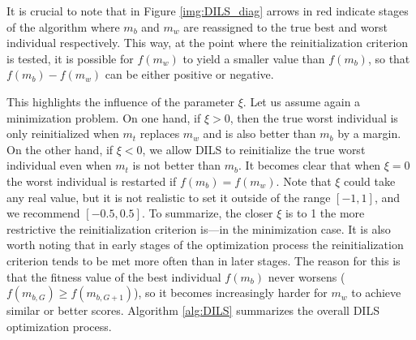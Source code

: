 It is crucial to note that in Figure \ref{img:DILS_diag} arrows in red indicate stages of the algorithm where $m_b$ and $m_w$ are reassigned to the true best and worst individual respectively. This way, at the point where the reinitialization criterion is tested, it is possible for $f(m_w)$ to yield a smaller value than $f(m_b)$, so that $f(m_b) - f(m_w)$ can be either positive or negative. 

This highlights the influence of the parameter $\xi$. Let us assume again a minimization problem. On one hand, if $\xi > 0$, then the true worst individual is only reinitialized when $m_t$ replaces $m_w$ and is also better than $m_b$ by a margin. On the other hand, if $\xi < 0$, we allow \acs{DILS} to reinitialize the true worst individual even when $m_t$ is not better than $m_b$. It becomes clear that when $\xi = 0$ the worst individual is restarted if $f(m_b) = f(m_w)$. Note that $\xi$ could take any real value, but it is not realistic to set it outside of the range $[-1,1]$, and we recommend $[-0.5, 0.5]$. To summarize, the closer $\xi$ is to 1 the more restrictive the reinitialization criterion is---in the minimization case. It is also worth noting that in early stages of the optimization process the reinitialization criterion tends to be met more often than in later stages. The reason for this is that the fitness value of the best individual $f(m_b)$ never worsens ($f(m_{b,G}) \ge f(m_{b,G+1})$), so it becomes increasingly harder for $m_w$ to achieve similar or better scores. Algorithm \ref{alg:DILS} summarizes the overall \acs{DILS} optimization process.

